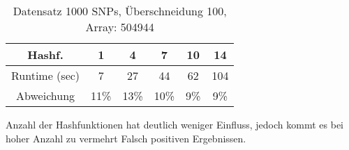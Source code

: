 \documentclass{beamer}
\begin{document}
\begin{frame}
	\begin{table}[h]
		
		\begin{tabular}{c|c|c|c|c|c}
			Hashf.&1&4&7&10&14\\
			\hline
			Runtime (sec)&7&27&44&62&104\\
			Abweichung&11\%&13\%&10\%&9\%&9\%\\
			
			
		\end{tabular}
		\caption{Datensatz 1000 SNPs, Überschneidung 100, Array: 504944 }
		\label{tab:meinetabelle4}
	\end{table}
	
	\begin{arrowlist}
		\item Anzahl der Hashfunktionen hat deutlich weniger Einfluss, jedoch kommt es bei hoher Anzahl zu vermehrt Falsch positiven Ergebnissen.
	\end{arrowlist}
\end{frame}
\end{document}
